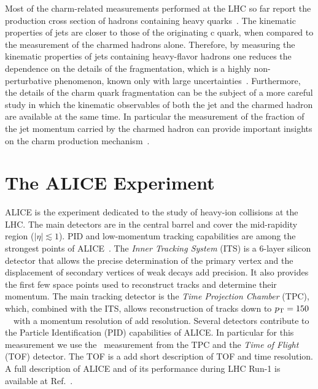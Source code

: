 \documentclass[a4paper]{jpconf}
\begin{document}
Most of the charm-related measurements performed at the LHC so far report the production cross section of hadrons
containing heavy quarks~\cite{ALICE:2012d, ALICE:2012e, ATLAS:2012e, LHCb:2013a, ALICE:2014d, ATLAS:2014e, ALICE:2015c, ALICE:2015d, ALICE:2016a, ATLAS:2016a}.
The kinematic properties of jets are closer to those of the originating c quark, when compared to the measurement of the charmed hadrons alone.
Therefore, by measuring the kinematic properties of jets containing heavy-flavor hadrons 
one reduces the dependence on the details of the fragmentation, which is a highly non-perturbative phenomenon, known only with large uncertainties~\cite{dEnterria:2014}.
Furthermore, the details of the charm quark fragmentation can be the subject of a more careful study in which the kinematic observables 
of both the jet and the charmed hadron are available at the same time. In particular the measurement of the fraction of the jet momentum carried 
by the charmed hadron can provide important insights on the charm production mechanism~\cite{CDF:1990, UA1:1990, STAR:2009a, ATLAS:2012d}.

\section{The ALICE Experiment}
ALICE is the experiment dedicated to the study of heavy-ion collisions at the LHC.
The main detectors are in the central barrel and cover the mid-rapidity region ($\lvert \eta\rvert \lesssim 1$).
PID and low-momentum tracking capabilities are among the strongest points of ALICE~\cite{ALICE:2014b}.
The \emph{Inner Tracking System} (ITS) is a 6-layer silicon detector that allows the precise determination of the primary vertex and the displacement of 
secondary vertices of weak decays {\color{red} add precision}. It also provides the first few space points used to reconstruct tracks and determine their momentum.
The main tracking detector is the \emph{Time Projection Chamber} (TPC), which, combined with the ITS, allows reconstruction of tracks down to $p_{\rm T}=150$~\GeVc\ with a momentum resolution
of {\color{red} add resolution}. Several detectors contribute to the Particle Identification (PID) capabilities of ALICE. In particular for this measurement we use the \dedx\ measurement from the TPC and
the \emph{Time of Flight} (TOF) detector. The TOF is a {\color{red} add short description of TOF and time resolution}.
A full description of ALICE and of its performance during LHC Run-1 is available at Ref.~\cite{ALICE:2014b}.
\end{document}
